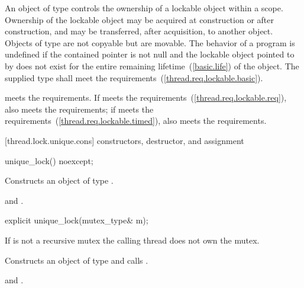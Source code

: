 \pnum
An object of type  controls the ownership of a lockable
object within a scope. Ownership of the lockable object may be acquired at
construction or after construction, and may be transferred, after
acquisition, to another  object. Objects of type  are not
copyable but are movable. The behavior of a program is undefined if the contained pointer
 is not null and the lockable object pointed
to by  does not exist for the entire remaining
lifetime~(\ref{basic.life}) of the  object. The supplied
 type shall meet the 
requirements~(\ref{thread.req.lockable.basic}).

\pnum
\begin{note}  meets the  requirements. If 
meets the  requirements~(\ref{thread.req.lockable.req}),
 also meets the  requirements;
if 
meets the  requirements~(\ref{thread.req.lockable.timed}),
 also meets the  requirements. \end{note}

[thread.lock.unique.cons]{ constructors, destructor, and assignment}

%
\begin{itemdecl}
unique_lock() noexcept;
\end{itemdecl}

\begin{itemdescr}
\pnum
\effects Constructs an object of type .

\pnum
\postconditions {} and .
\end{itemdescr}

%
\begin{itemdecl}
explicit unique_lock(mutex_type& m);
\end{itemdecl}

\begin{itemdescr}
\pnum
\precondition If  is not a recursive mutex the calling thread does not own the mutex.

\pnum
\effects Constructs an object of type  and calls .

\pnum
\postconditions {} and .
\end{itemdescr}

